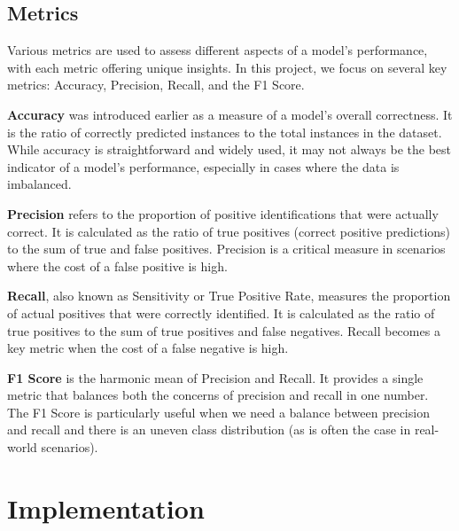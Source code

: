 \documentclass[letterpaper,10pt]{article}
\begin{document}
\subsection{Metrics}
Various metrics are used to assess different aspects of a model's performance, with each metric offering unique insights. In this project, we focus on several key metrics: Accuracy, Precision, Recall, and the F1 Score. \par

\textbf{Accuracy} was introduced earlier as a measure of a model's overall correctness. It is the ratio of correctly predicted instances to the total instances in the dataset. While accuracy is straightforward and widely used, it may not always be the best indicator of a model's performance, especially in cases where the data is imbalanced. \par

\textbf{Precision} refers to the proportion of positive identifications that were actually correct. It is calculated as the ratio of true positives (correct positive predictions) to the sum of true and false positives. Precision is a critical measure in scenarios where the cost of a false positive is high. \par

\textbf{Recall}, also known as Sensitivity or True Positive Rate, measures the proportion of actual positives that were correctly identified. It is calculated as the ratio of true positives to the sum of true positives and false negatives. Recall becomes a key metric when the cost of a false negative is high. \par

\textbf{F1 Score} is the harmonic mean of Precision and Recall. It provides a single metric that balances both the concerns of precision and recall in one number. The F1 Score is particularly useful when we need a balance between precision and recall and there is an uneven class distribution (as is often the case in real-world scenarios). \par



\newpage
\section{Implementation}
\end{document}
